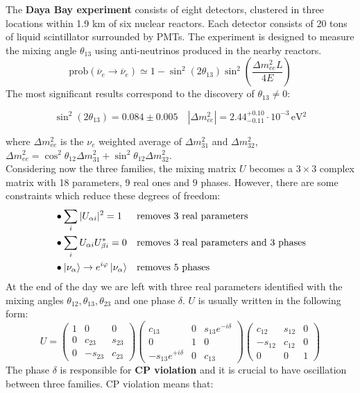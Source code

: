 \documentclass[10.75pt,a4paper,openright,bottom=2cm]{article}
\newcommand{\beginbox}[1]{\begin{tcolorbox}[width=\textwidth,colback={black!40},title={#1},colbacktitle={purple!55},coltitle=black]}
\renewcommand{\endbox}{\end{tcolorbox}\noindent}
\begin{document}
\noindent
The \textbf{Daya Bay experiment} consists of eight detectors, clustered in three locations within 1.9 km of six nuclear reactors. Each detector consists of 20 tons of liquid scintillator surrounded by PMTs. The experiment is designed to measure the mixing angle $\theta_{13}$ using anti-neutrinos produced in the nearby reactors.
\[
\text{prob}(\overline{\nu}_e\to\overline{\nu}_e)\simeq1-\sin^2(2\theta_{13})\sin^2\left(\frac{\Delta m^2_{ee}L}{4E}\right)
\]
The most significant results correspond to the discovery of $\theta_{13}\neq0$:
\beginbox{Daya Bay Results}
\[
\sin^2(2\theta_{13})=0.084\pm0.005 \quad |\Delta m^2_{ee}|=2.44^{+0.10}_{-0.11}\cdot10^{-3}\,\text{eV$^2$}
\]
\endbox
where $\Delta m^2_{ee}$ is the $\nu_e$ weighted average of $\Delta m^2_{31}$ and $\Delta m^2_{32}$, $\Delta m^2_{ee}=\cos^2\theta_{12}\Delta m^2_{31}+\sin^2\theta_{12}\Delta m^2_{32}$.\\
Considering now the three families, the mixing matrix $U$ becomes a $3\times3$ complex matrix with 18 parameters, 9 real ones and 9 phases. However, there are some constraints which reduce these degrees of freedom:
\[
\begin{aligned}
&\bullet \sum_i|U_{\alpha i}|^2=1 &&\text{removes 3 real parameters}\\
&\bullet \sum_iU_{\alpha i}U_{\beta i}^*=0 &&\text{removes 3 real parameters and 3 phases}\\
&\bullet \ket{\nu_\alpha}\to e^{i\varphi}\ket{\nu_\alpha} &&\text{removes 5 phases}
\end{aligned}
\]
At the end of the day we are left with three real parameters identified with the mixing angles $\theta_{12}, \theta_{13}, \theta_{23}$ and one phase $\delta$. $U$ is usually written in the following form:
\[
U=\begin{pmatrix}
    1 & 0 & 0\\
    0 & c_{23} & s_{23}\\
    0 & -s_{23} & c_{23}
\end{pmatrix}
\begin{pmatrix}
    c_{13} & 0 & s_{13}e^{-i\delta}\\
    0 & 1 & 0\\
    -s_{13}e^{+i\delta} & 0 & c_{13}
\end{pmatrix}
\begin{pmatrix}
    c_{12} & s_{12} & 0\\
    -s_{12} & c_{12} & 0\\
    0 & 0 & 1
\end{pmatrix}
\]
The phase $\delta$ is responsible for \textbf{CP violation} and it is crucial to have oscillation between three families. CP violation means that:
\end{document}

